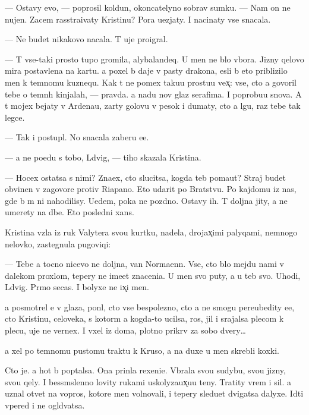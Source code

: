 \documentclass[10pt]{book}
\begin{document}
— Ostavy {\y}evo, — poprosil koldun, okoncatelyno sobrav sumku. — Nam on ne nujen. Zacem rasstra{\y}ivaty Kristinu? Pora u{\y}ezjaty. I nacinaty vse snacala.

— Ne budet nikakovo nacala. T{\yi} uje pro{\y}igral.

— T{\yi} vse-taki prosto tupo{\y} gromila, alybalandeq. U men{\ia} ne b{\yi}lo v{\yi}bora. Jizny qelovo mira postavlena na kartu. {\Y}a poxel b{\yi} daje v pasty drakona, {\y}esli b{\yi} eto priblizilo men{\ia} k temnomu kuznequ. Kak t{\yi} ne po{\y}mex taku{\y}u prostu{\y}u vex̨: vse, cto {\y}a govoril tebe o temn{\yi}h kinjalah, — pravda. {\Y}a na{\y}du nov{\yi}{\y} glaz serafima. I poprobu{\y}u snova. A t{\yi} mojex bejaty v Ardenau, zar{\yi}ty golovu v pesok i dumaty, cto {\y}a lgu, raz tebe tak legce.

— Tak i postupl{\iu}. No snacala zaberu {\y}e{\y}e.

— {\Y}a ne po{\y}edu s tobo{\y}, L{\iu}dvig, — tiho skazala Kristina.

— Hocex ostatsa s nimi? Zna{\y}ex, cto slucitsa, kogda teb{\ia} po{\y}ma{\y}ut? Straj budet obvinen v zagovore protiv Riapano. Eto udarit po Bratstvu. Po kajdomu iz nas, gde b{\yi} m{\yi} ni nahodilisy. Uedem, poka ne pozdno. Ostavy ih. T{\yi} doljna jity, a ne umerety na d{\yi}be. Eto posledni{\y} xans.

Kristina vz{\ia}la iz ruk Valytera svo{\y}u kurtku, nadela, drojax̨imi palyqami, nemnogo nelovko, zastegnula pugoviqi:

— Tebe {\y}a tocno nicevo ne doljna, van Norma{\y}enn. Vse, cto b{\yi}lo mejdu nami v dalekom proxlom, tepery ne ime{\y}et znaceni{\y}a. U men{\ia} svo{\y} puty, a u teb{\ia} svo{\y}. Uhodi, L{\iu}dvig. Pr{\ia}mo se{\y}cas. I bolyxe ne ix̨i men{\ia}.

{\Y}a posmotrel {\y}e{\y} v glaza, pon{\ia}l, cto vse bespolezno, cto {\y}a ne smogu pereubedity {\y}e{\y}e, cto Kristinu, celoveka, s kotor{\yi}m {\y}a kogda-to ucilsa, ros, jil i srajalsa plecom k plecu, uje ne vernex. I v{\yi}xel iz doma, plotno prikr{\yi}v za sobo{\y} dvery…

{\Y}a xel po temnomu pustomu traktu k Kruso, a na duxe u men{\ia} skrebli koxki.

Cto je. {\Y}a hot{\ia} b{\yi} pop{\yi}talsa. Ona prin{\ia}la rexeni{\y}e. V{\yi}brala svo{\y}u sudybu, svo{\y}u jizny, svo{\y}u qely. I bessm{\yi}slenno lovity rukami uskolyza{\y}ux̨u{\y}u teny. Tratity vrem{\ia} i sil{\yi}. {\Y}a uznal otvet{\yi} na vopros{\yi}, kotor{\yi}{\y}e men{\ia} volnovali, i tepery sledu{\y}et dvigatsa dalyxe. Idti vpered i ne ogl{\ia}d{\yi}vatsa.
\end{document}
